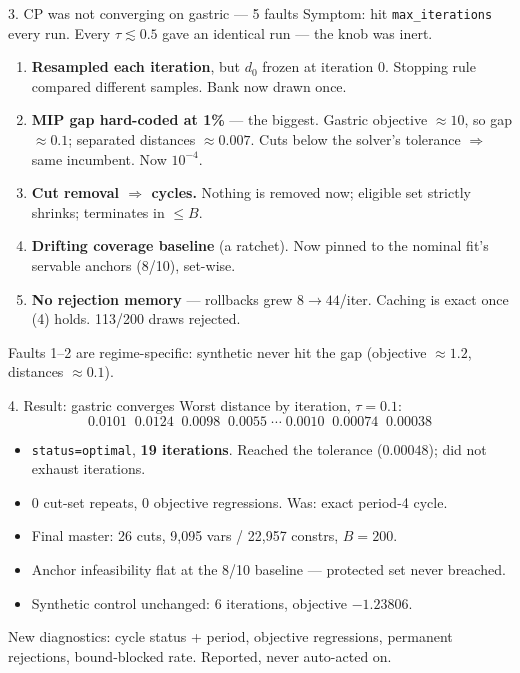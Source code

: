 \documentclass{beamer}
\begin{document}
\begin{frame}{3. CP was not converging on gastric --- 5 faults}
  \small
  Symptom: hit \texttt{max\_iterations} every run. Every $\tau\lesssim0.5$ gave an
  identical run --- the knob was inert.
  \begin{enumerate}
    \item \textbf{Resampled each iteration}, but $d_0$ frozen at iteration 0. Stopping
      rule compared different samples. Bank now drawn once.
    \item \textbf{MIP gap hard-coded at 1\%} --- the biggest. Gastric objective
      ${\approx}10$, so gap ${\approx}0.1$; separated distances ${\approx}0.007$.
      Cuts below the solver's tolerance $\Rightarrow$ same incumbent. Now $10^{-4}$.
    \item \textbf{Cut removal $\Rightarrow$ cycles.} Nothing is removed now; eligible
      set strictly shrinks; terminates in $\le B$.
    \item \textbf{Drifting coverage baseline} (a ratchet). Now pinned to the nominal
      fit's servable anchors (8/10), set-wise.
    \item \textbf{No rejection memory} --- rollbacks grew $8\to44$/iter. Caching is
      exact once (4) holds. 113/200 draws rejected.
  \end{enumerate}
  \medskip
  \footnotesize
  Faults 1--2 are regime-specific: synthetic never hit the gap (objective
  ${\approx}1.2$, distances ${\approx}0.1$).
\end{frame}

\begin{frame}{4. Result: gastric converges}
  \small
  Worst distance by iteration, $\tau=0.1$:
  \[
    0.0101 \;\; 0.0124 \;\; 0.0098 \;\; 0.0055 \;\cdots\; 0.0010 \;\; 0.00074 \;\;
    \mathbf{0.00038}
  \]
  \begin{itemize}
    \item \texttt{status=optimal}, \textbf{19 iterations}. Reached the tolerance
      ($0.00048$); did not exhaust iterations.
    \item 0 cut-set repeats, 0 objective regressions. Was: exact period-4 cycle.
    \item Final master: 26 cuts, 9{,}095 vars / 22{,}957 constrs, $B=200$.
    \item Anchor infeasibility flat at the 8/10 baseline --- protected set never
      breached.
    \item Synthetic control unchanged: 6 iterations, objective $-1.23806$.
  \end{itemize}
  \medskip
  \footnotesize
  New diagnostics: cycle status + period, objective regressions, permanent
  rejections, bound-blocked rate. Reported, never auto-acted on.
\end{frame}
\end{document}
